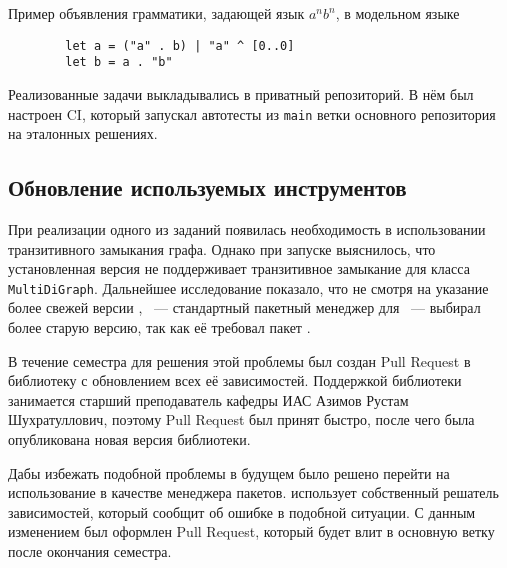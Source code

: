 \begin{listing}
    \caption{Пример объявления грамматики, задающей язык $a^n b^n$, в модельном языке}
    \begin{verbatim}
        let a = ("a" . b) | "a" ^ [0..0]
        let b = a . "b"
        \end{verbatim}
    \label{listing:example}
\end{listing}

Реализованные задачи выкладывались в приватный репозиторий.
В нём был настроен CI, который запускал автотесты из \texttt{main} ветки основного репозитория на эталонных решениях.

\subsection{Обновление используемых инструментов}
\label{subsec:housekeeping}

При реализации одного из заданий появилась необходимость в использовании транзитивного замыкания графа.
Однако при запуске выяснилось, что установленная версия \networkx{} не поддерживает транзитивное замыкание для класса \texttt{MultiDiGraph}.
Дальнейшее исследование показало, что не смотря на указание более свежей версии \networkx{}, \pip{}~--- стандартный пакетный менеджер для \python{}~--- выбирал более старую версию, так как её требовал пакет \cfpqdata{}.

В течение семестра для решения этой проблемы был создан Pull Request в библиотеку \cfpqdata{} с обновлением всех её зависимостей.
Поддержкой библиотеки занимается старший преподаватель кафедры ИАС Азимов Рустам Шухратуллович, поэтому Pull Request был принят быстро, после чего была опубликована новая версия библиотеки.

Дабы избежать подобной проблемы в будущем было решено перейти на использование \poetry{} в качестве менеджера пакетов.
\poetry{} использует собственный решатель зависимостей, который сообщит об ошибке в подобной ситуации.
С данным изменением был оформлен Pull Request, который будет влит в основную ветку после окончания семестра.
